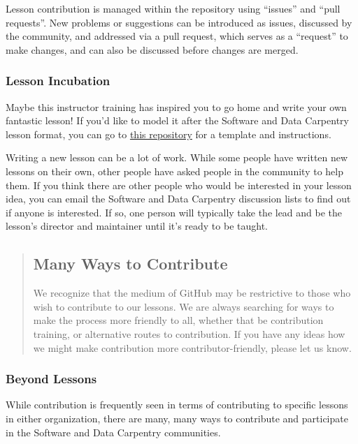 Lesson contribution is managed within the repository using ``issues''
and ``pull requests''.  New problems or suggestions can be introduced
as issues, discussed by the community, and addressed via a pull
request, which serves as a ``request'' to make changes, and can also
be discussed before changes are merged.

\subsubsection*{Lesson Incubation}

Maybe this instructor training has inspired you to go home and write your
own fantastic lesson!  If you'd like to model it after the Software and
Data Carpentry lesson format, you can go to \href{\{\{ site.example\_repo \}\}}{this repository} for
a template and instructions.

Writing a new lesson can be a lot of work.  While some people have written
new lessons on their own, other people have asked people in the community to
help them.  If you think there are other people who would be interested in
your lesson idea, you can email the Software and Data Carpentry discussion
lists to find out if anyone is interested.  If so, one person will typically
take the lead and be the lesson's director and maintainer until it's ready to
be taught.

\begin{quotation}   %
\subsection*{Many Ways to Contribute}

We recognize that the medium of GitHub may be restrictive to those
who wish to contribute to our lessons.  We are always searching for
ways to make the process more friendly to all, whether that be
contribution training, or alternative routes to contribution.  If you
have any ideas how we might make contribution more contributor-friendly,
please let us know.
\end{quotation}   %

\subsubsection*{Beyond Lessons}

While contribution is frequently seen in terms of contributing
to specific lessons in either organization, there
are many, many ways to contribute and participate in the Software and Data
Carpentry communities.

